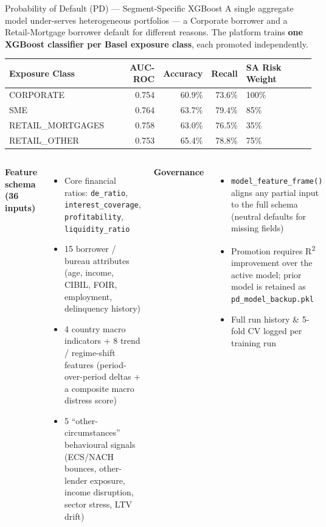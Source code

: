 \documentclass[9pt,aspectratio=169]{beamer}
\begin{document}
\begin{frame}{Probability of Default (PD) --- Segment-Specific XGBoost}
\vspace{-2pt}
{\footnotesize A single aggregate model under-serves heterogeneous portfolios --- a Corporate
borrower and a Retail-Mortgage borrower default for different reasons. The platform trains
\textbf{one XGBoost classifier per Basel exposure class}, each promoted independently.}\\[6pt]
\begin{center}
\footnotesize
\begin{tabular}{lrrrl}
  \toprule
  \textbf{Exposure Class} & \textbf{AUC-ROC} & \textbf{Accuracy} & \textbf{Recall} & \textbf{SA Risk Weight}\\
  \midrule
  CORPORATE          & 0.754 & 60.9\% & 73.6\% & 100\%\\
  SME                & 0.764 & 63.7\% & 79.4\% & 85\%\\
  RETAIL\_MORTGAGES  & 0.758 & 63.0\% & 76.5\% & 35\%\\
  RETAIL\_OTHER      & 0.753 & 65.4\% & 78.8\% & 75\%\\
  \bottomrule
\end{tabular}
\end{center}
\vspace{6pt}
\begin{columns}[T]
    \textbf{Feature schema (36 inputs)}
    \begin{itemize}\setlength\itemsep{2pt}
      \item[\small$\bullet$] Core financial ratios: \texttt{de\_ratio}, \texttt{interest\_coverage},
            \texttt{profitability}, \texttt{liquidity\_ratio}
      \item[\small$\bullet$] 15 borrower / bureau attributes (age, income, CIBIL, FOIR, employment,
            delinquency history)
      \item[\small$\bullet$] 4 country macro indicators + 8 trend / regime-shift features
            (period-over-period deltas + a composite macro distress score)
      \item[\small$\bullet$] 5 ``other-circumstances'' behavioural signals (ECS/NACH bounces,
            other-lender exposure, income disruption, sector stress, LTV drift)
    \end{itemize}
    \textbf{Governance}
    \begin{itemize}\setlength\itemsep{2pt}
      \item[\small$\bullet$] \texttt{model\_feature\_frame()} aligns any partial input to the
            full schema (neutral defaults for missing fields)
      \item[\small$\bullet$] Promotion requires R\textsuperscript{2} improvement over the active model;
            prior model is retained as \texttt{pd\_model\_backup.pkl}
      \item[\small$\bullet$] Full run history \& 5-fold CV logged per training run
    \end{itemize}
\end{columns}
\end{frame}
\end{document}
